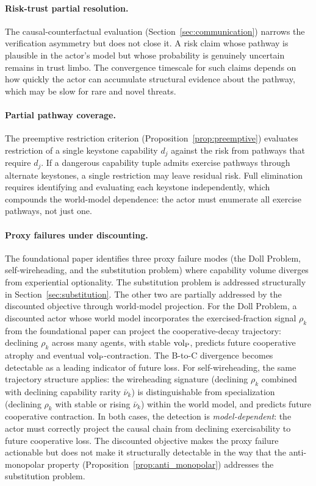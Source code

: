 \paragraph{Risk-trust partial resolution.} The causal-counterfactual
evaluation (Section~\ref{sec:communication}) narrows the verification
asymmetry but does not close it. A risk claim whose pathway is plausible in
the actor's model but whose probability is genuinely uncertain remains in
trust limbo. The convergence timescale for such claims depends on how quickly
the actor can accumulate structural evidence about the pathway, which may be
slow for rare and novel threats.

\paragraph{Partial pathway coverage.} The preemptive restriction criterion
(Proposition~\ref{prop:preemptive}) evaluates restriction of a single
keystone capability $d_j$ against the risk from pathways that require $d_j$.
If a dangerous capability tuple admits exercise pathways through alternate
keystones, a single restriction may leave residual risk. Full elimination
requires identifying and evaluating each keystone independently, which
compounds the world-model dependence: the actor must enumerate all exercise
pathways, not just one.

\paragraph{Proxy failures under discounting.} The foundational paper
identifies three proxy failure modes (the Doll Problem, self-wireheading,
and the substitution problem) where capability volume diverges from
experiential optionality. The substitution problem is addressed structurally
in Section~\ref{sec:substitution}. The other two are partially addressed by
the discounted objective through world-model projection. For the Doll
Problem, a discounted actor whose world model incorporates the
exercised-fraction signal $\rho_k$ from the foundational paper can project
the cooperative-decay trajectory: declining $\rho_k$ across many agents,
with stable ${\operatorname{vol}_{\mathrm{P}}}$, predicts future cooperative atrophy and eventual
${\operatorname{vol}_{\mathrm{P}}}$-contraction. The B-to-C divergence becomes detectable as a leading
indicator of future loss. For self-wireheading, the same trajectory
structure applies: the wireheading signature (declining $\rho_k$ combined
with declining capability rarity $\bar{\nu}_k$) is distinguishable from
specialization (declining $\rho_k$ with stable or rising $\bar{\nu}_k$)
within the world model, and predicts future cooperative contraction. In both
cases, the detection is \emph{model-dependent}: the actor must correctly
project the causal chain from declining exercisability to future cooperative
loss. The discounted objective makes the proxy failure actionable but does
not make it structurally detectable in the way that the anti-monopolar
property (Proposition~\ref{prop:anti_monopolar}) addresses the substitution
problem.

